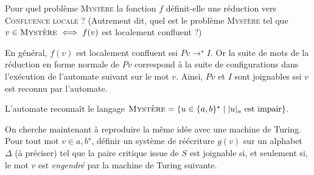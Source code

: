 \begin{exercice}
  \ifcorrection{\pagebreak}
  \begin{questions}
  \item 
    Pour quel problème \textsc{Mystère} la fonction $f$ définit-elle une réduction vers
    \textsc{Confluence locale} ?  
    (Autrement dit, quel est le problème \textsc{Mystère} tel que
    $v\in \textsc{Mystère} \iff f(v)$ est localement confluent ?)
  \end{questions}
  \begin{corrections}
    En général, $f(v)$ est localement confluent ssi $Pv\to^\star I$. 
    Or la suite de mots de la réduction en forme normale de $Pv$ correspond à la suite de configurations dans l'exécution de
    l'automate suivant sur le mot $v$. Ainsi, $Pv$ et $I$ sont joignables ssi $v$ est reconnu par l'automate. 
    \begin{center}
    \end{center}
    L'automate reconnaît le langage $\textsc{Mystère} = \{u \in \{a, b\}^\star \mid |u|_a \text{ est impair}\}$.
  \end{corrections}
  
  \ifnotcorrection{\newpage}
  \begin{questions}
  \item On cherche maintenant à reproduire la même idée avec une machine de Turing.
    Pour tout mot $v\in{a,b}^\star$, définir un système de réécriture $g(v)$ sur un alphabet
    $\Delta$ (à préciser) tel que la paire critique issue de $S$ est joignable si,
    et seulement si, le mot $v$ est \emph{engendré} par la machine de Turing suivante.

    \begin{center}
\end{center}
\end{questions}
\end{exercice}
